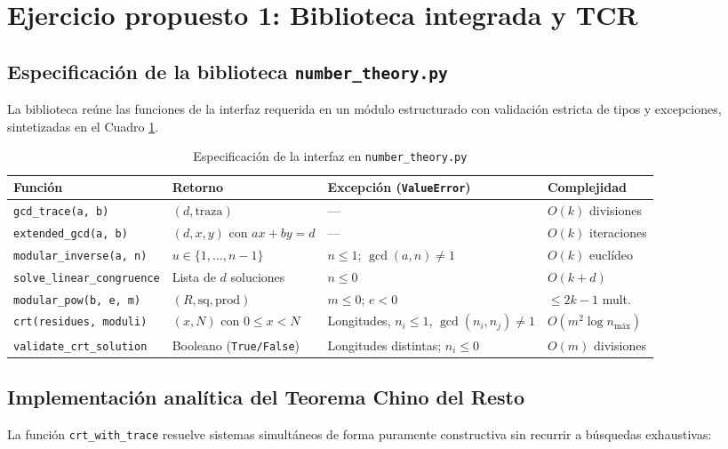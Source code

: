 \section{Ejercicio propuesto 1: Biblioteca integrada y TCR}

\subsection{Especificación de la biblioteca \texttt{number\_theory.py}}
La biblioteca reúne las funciones de la interfaz requerida en un módulo estructurado con validación estricta de tipos y excepciones, sintetizadas en el Cuadro \ref{tab:resumen_funciones}.

\begin{table}[H]
    \caption{Especificación de la interfaz en \texttt{number\_theory.py}}
    \label{tab:resumen_funciones}
    \centering
    \footnotesize
    \begin{tabular*}{\textwidth}{@{\extracolsep{\fill}}llll}
        \toprule
        \textbf{Función} & \textbf{Retorno} & \textbf{Excepción (\texttt{ValueError})} & \textbf{Complejidad} \\
        \midrule
        \texttt{gcd\_trace(a, b)} & $(d, \text{traza})$ & — & $O(k)$ divisiones \\
        \texttt{extended\_gcd(a, b)} & $(d, x, y)$ con $ax+by=d$ & — & $O(k)$ iteraciones \\
        \texttt{modular\_inverse(a, n)} & $u \in \{1, \dots, n-1\}$ & $n \le 1$; $\gcd(a, n) \neq 1$ & $O(k)$ euclídeo \\
        \texttt{solve\_linear\_congruence} & Lista de $d$ soluciones & $n \le 0$ & $O(k + d)$ \\
        \texttt{modular\_pow(b, e, m)} & $(R, \text{sq}, \text{prod})$ & $m \le 0$; $e < 0$ & $\le 2k - 1$ mult. \\
        \texttt{crt(residues, moduli)} & $(x, N)$ con $0 \le x < N$ & Longitudes, $n_i \le 1$, $\gcd(n_i, n_j) \neq 1$ & $O(m^2 \log n_{\text{máx}})$ \\
        \texttt{validate\_crt\_solution} & Booleano (\texttt{True/False}) & Longitudes distintas; $n_i \le 0$ & $O(m)$ divisiones \\
        \bottomrule
    \end{tabular*}
\end{table}

\subsection{Implementación analítica del Teorema Chino del Resto}
La función \texttt{crt\_with\_trace} resuelve sistemas simultáneos de forma puramente constructiva sin recurrir a búsquedas exhaustivas:

